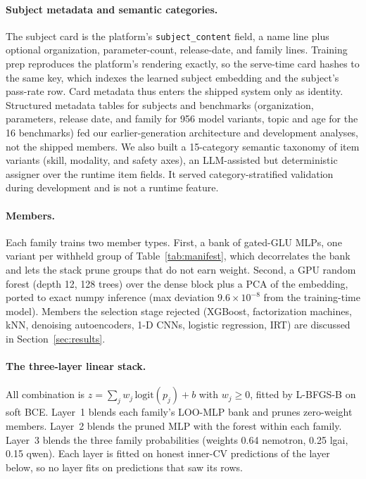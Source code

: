 \documentclass{article}
\begin{document}
\paragraph{Subject metadata and semantic categories.}
The subject card is the platform's \texttt{subject\_content} field, a name line plus optional organization, parameter-count, release-date, and family lines. Training prep reproduces the platform's rendering exactly, so the serve-time card hashes to the same key, which indexes the learned subject embedding and the subject's pass-rate row. Card metadata thus enters the shipped system only as identity. Structured metadata tables for subjects and benchmarks (organization, parameters, release date, and family for 956 model variants, topic and age for the 16 benchmarks) fed our earlier-generation architecture and development analyses, not the shipped members. We also built a 15-category semantic taxonomy of item variants (skill, modality, and safety axes), an LLM-assisted but deterministic assigner over the runtime item fields. It served category-stratified validation during development and is not a runtime feature.

\paragraph{Members.}
Each family trains two member types. First, a bank of gated-GLU MLPs, one variant per withheld group of Table~\ref{tab:manifest}, which decorrelates the bank and lets the stack prune groups that do not earn weight. Second, a GPU random forest (depth 12, 128 trees) over the dense block plus a PCA of the embedding, ported to exact numpy inference (max deviation $9.6\times 10^{-8}$ from the training-time model). Members the selection stage rejected (XGBoost, factorization machines, kNN, denoising autoencoders, 1-D CNNs, logistic regression, IRT) are discussed in Section~\ref{sec:results}.

\paragraph{The three-layer linear stack.}
All combination is $z=\sum_j w_j\,\mathrm{logit}(p_j)+b$ with $w_j\ge 0$, fitted by L-BFGS-B on soft BCE. Layer~1 blends each family's LOO-MLP bank and prunes zero-weight members. Layer~2 blends the pruned MLP with the forest within each family. Layer~3 blends the three family probabilities (weights 0.64 nemotron, 0.25 lgai, 0.15 qwen). Each layer is fitted on honest inner-CV predictions of the layer below, so no layer fits on predictions that saw its rows.
\end{document}
